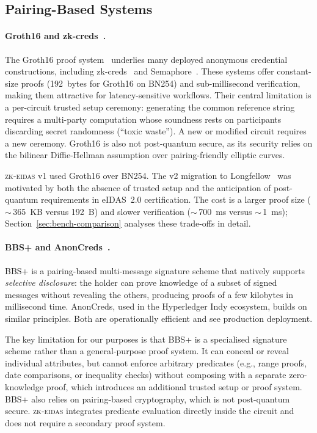 \subsection{Pairing-Based Systems}\label{sec:rel-pairing}

\paragraph{Groth16 and zk-creds~\cite{zkcreds}.}
The Groth16 proof system~\cite{groth16} underlies many deployed anonymous
credential constructions, including zk-creds~\cite{zkcreds} and
Semaphore~\cite{semaphore}.  These systems offer constant-size proofs
(192~bytes for Groth16 on BN254) and sub-millisecond verification, making
them attractive for latency-sensitive workflows.  Their central limitation
is a per-circuit trusted setup ceremony: generating the common reference
string requires a multi-party computation whose soundness rests on
participants discarding secret randomness (``toxic waste'').  A new or
modified circuit requires a new ceremony.  Groth16 is also not
post-quantum secure, as its security relies on the bilinear Diffie-Hellman
assumption over pairing-friendly elliptic curves.

\textsc{zk-eidas} v1 used Groth16 over BN254.  The v2 migration to
Longfellow~\cite{longfellow} was motivated by both the absence of trusted
setup and the anticipation of post-quantum requirements in eIDAS~2.0
certification.  The cost is a larger proof size (${\sim}\,$365~KB versus
192~B) and slower verification (${\sim}\,$700~ms versus ${\sim}\,$1~ms);
Section~\ref{sec:bench-comparison} analyses these trade-offs in detail.

\paragraph{BBS+ and AnonCreds~\cite{bbs}.}
BBS+ is a pairing-based multi-message signature scheme that natively
supports \emph{selective disclosure}: the holder can prove knowledge of a
subset of signed messages without revealing the others, producing proofs of
a few kilobytes in millisecond time.  AnonCreds, used in the Hyperledger
Indy ecosystem, builds on similar principles.  Both are operationally
efficient and see production deployment.

The key limitation for our purposes is that BBS+ is a specialised
signature scheme rather than a general-purpose proof system.  It can
conceal or reveal individual attributes, but cannot enforce arbitrary
predicates (e.g., range proofs, date comparisons, or inequality checks)
without composing with a separate zero-knowledge proof, which introduces
an additional trusted setup or proof system.  BBS+ also relies on
pairing-based cryptography, which is not post-quantum secure.
\textsc{zk-eidas} integrates predicate evaluation directly inside the
circuit and does not require a secondary proof system.

